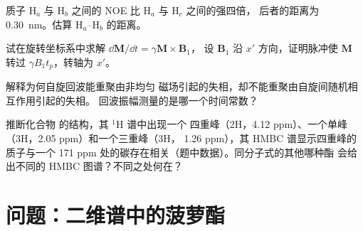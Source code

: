 \begin{exercise}[$\star\star$]\label{exo:b3:advanced-nmr:9}
质子 H$_a$ 与 H$_b$ 之间的 NOE 比 H$_a$ 与 H$_c$ 之间的强四倍，
后者的距离为 \qty{0.30}{nm}。估算 H$_a$--H$_b$ 的距离。
\end{exercise}

\begin{exercise}[$\star\star\star$]\label{exo:b3:advanced-nmr:10}
试在旋转坐标系中求解 $\dd\mathbf M/\dd t = \gamma\mathbf M\times\mathbf B_1$，
设 $\mathbf B_1$ 沿 $x'$ 方向，证明脉冲使 $\mathbf M$ 转过 $\gamma B_1t_p$，转轴为 $x'$。
\end{exercise}

\begin{exercise}[$\star\star\star$]\label{exo:b3:advanced-nmr:11}
解释为何自旋回波能重聚由非均匀
磁场引起的失相，却不能重聚由自旋间随机相互作用引起的失相。
回波振幅测量的是哪一个时间常数？
\end{exercise}

\begin{exercise}[$\star\star\star$]\label{exo:b3:advanced-nmr:12}
推断化合物  的结构，其 ${}^1$H 谱中出现一个
四重峰（2H，4.12 ppm）、一个单峰（3H，2.05 ppm）和一个三重峰（3H，
1.26 ppm），其 HMBC 谱显示四重峰的质子与一个
171 ppm 处的碳存在相关（题中数据）。同分子式的其他哪种酯
会给出不同的 HMBC 图谱？不同之处何在？
\end{exercise}

\section{问题：二维谱中的菠萝酯}

